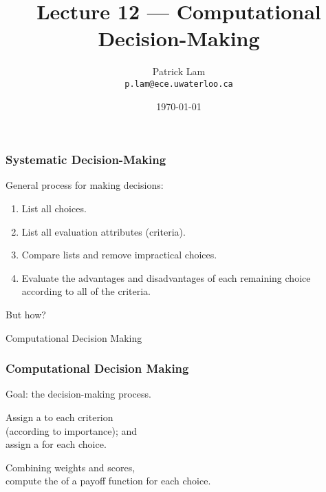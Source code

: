 

\title{Lecture 12 --- Computational Decision-Making}

\author{Patrick Lam \\ \small \texttt{p.lam@ece.uwaterloo.ca}}
\date{\today}




\begin{frame}
  \titlepage
\end{frame}

\begin{frame}
\frametitle{Systematic Decision-Making}

\begin{changemargin}{1cm}
General process for making decisions:

\begin{enumerate}
\item List all choices.
\item List all evaluation attributes (criteria).
\item Compare lists and remove impractical choices.
\item Evaluate the advantages and disadvantages of each remaining choice
according to all of the criteria.
\end{enumerate}

But how?
\end{changemargin}

\end{frame}

\begin{frame}
	
	
	\vspace{8em}
	
	\begin{block}
	 {\huge Computational Decision Making}
	\end{block}
	
\end{frame}


\begin{frame}
\frametitle{Computational Decision Making}

\begin{changemargin}{1cm}

Goal:  the decision-making process.

Assign a  to each criterion \\ \qquad (according to importance); and\\
assign a  for each choice.

Combining weights and scores,\\
compute the  of
a payoff function for each choice.

\end{changemargin}

\end{frame}

